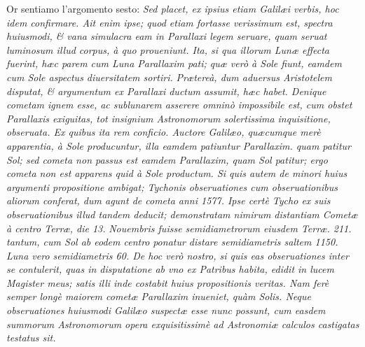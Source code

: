 \documentclass[11pt,twoside,openany]{book}
\begin{document}
\par\bigskip\noindent{}\enspace Or sentiamo l'argomento sesto: \textit{Sed placet, ex ipsius etiam Galilæi verbis, hoc idem confirmare. Ait enim ipse; quod etiam fortasse verissimum est, spectra huiusmodi, \& }\textit{vana simulacra eam in Parallaxi legem seruare, quam seruat luminosum illud corpus, à quo proueniunt. Ita, si qua illorum Lunæ effecta fuerint, hæc parem cum Luna Parallaxim pati; quæ verò à Sole fiunt, eamdem cum Sole aspectus diuersitatem sortiri. }\textit{Prætereà, dum aduersus Aristotelem disputat, \& argumentum ex Parallaxi ductum assumit, hæc habet. Denique cometam ignem esse, ac sublunarem asserere omninò impossibile est, cum obstet Parallaxis exiguitas, tot insignium Astronomorum solertissima inquisitione, obseruata. Ex quibus ita rem conficio. Auctore Galilæo, quæcumque merè apparentia, à Sole producuntur, illa eamdem patiuntur Parallaxim. quam patitur Sol; sed cometa non passus est eamdem Parallaxim, quam Sol patitur; ergo cometa non est apparens quid à Sole productum. Si quis autem de minori huius argumenti propositione ambigat; Tychonis obseruationes cum obseruationibus aliorum conferat, dum agunt de cometa anni 1577. Ipse certè Tycho ex suis obseruationibus illud tandem deducit; demonstratam nimirum distantiam Cometæ à centro Terræ, die 13. }\textit{Nouembris fuisse semidiametrorum eiusdem Terræ. 211. tantum, cum Sol ab eodem centro }\textit{ponatur distare semidiametris saltem 1150. Luna vero semidiametris 60. De hoc verò nostro, si quis eas obseruationes inter se contulerit, quas in disputatione ab vno ex Patribus habita, edidit in lucem Magister meus; satis illi inde costabit huius propositionis veritas. Nam ferè semper longè maiorem cometæ Parallaxim inueniet, quàm Solis. Neque obseruationes huiusmodi Galilæo suspectæ esse nunc possunt, cum easdem summorum Astronomorum opera exquisitissimè ad Astronomiæ calculos castigatas testatus sit.}
\end{document}
